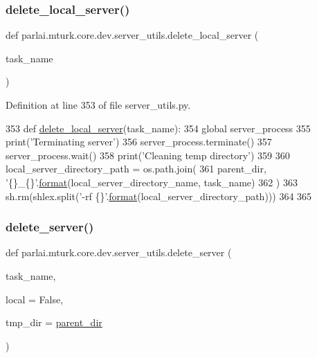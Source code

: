 \subsubsection{\texorpdfstring{delete\+\_\+local\+\_\+server()}{delete\_local\_server()}}
{\footnotesize\ttfamily def parlai.\+mturk.\+core.\+dev.\+server\+\_\+utils.\+delete\+\_\+local\+\_\+server (\begin{DoxyParamCaption}\item[{}]{task\+\_\+name }\end{DoxyParamCaption})}



Definition at line 353 of file server\+\_\+utils.\+py.


\begin{DoxyCode}
353 \textcolor{keyword}{def }\hyperlink{namespaceparlai_1_1mturk_1_1core_1_1server__utils_a9b4f4c3f696be001c2fa96b3690af83c}{delete\_local\_server}(task\_name):
354     \textcolor{keyword}{global} server\_process
355     print(\textcolor{stringliteral}{'Terminating server'})
356     server\_process.terminate()
357     server\_process.wait()
358     print(\textcolor{stringliteral}{'Cleaning temp directory'})
359 
360     local\_server\_directory\_path = os.path.join(
361         parent\_dir, \textcolor{stringliteral}{'\{\}\_\{\}'}.\hyperlink{namespaceparlai_1_1chat__service_1_1services_1_1messenger_1_1shared__utils_a32e2e2022b824fbaf80c747160b52a76}{format}(local\_server\_directory\_name, task\_name)
362     )
363     sh.rm(shlex.split(\textcolor{stringliteral}{'-rf \{\}'}.\hyperlink{namespaceparlai_1_1chat__service_1_1services_1_1messenger_1_1shared__utils_a32e2e2022b824fbaf80c747160b52a76}{format}(local\_server\_directory\_path)))
364 
365 
\end{DoxyCode}
\mbox{\label{namespaceparlai_1_1mturk_1_1core_1_1dev_1_1server__utils_a3e5b4105c54a289108a8a240aa9b9043}} 
\subsubsection{\texorpdfstring{delete\+\_\+server()}{delete\_server()}}
{\footnotesize\ttfamily def parlai.\+mturk.\+core.\+dev.\+server\+\_\+utils.\+delete\+\_\+server (\begin{DoxyParamCaption}\item[{}]{task\+\_\+name,  }\item[{}]{local = {\ttfamily False},  }\item[{}]{tmp\+\_\+dir = {\ttfamily \hyperlink{namespaceparlai_1_1mturk_1_1core_1_1dev_1_1server__utils_a432ae14c0d872fbfebe4d9b7d73d13b9}{parent\+\_\+dir}} }\end{DoxyParamCaption})}



